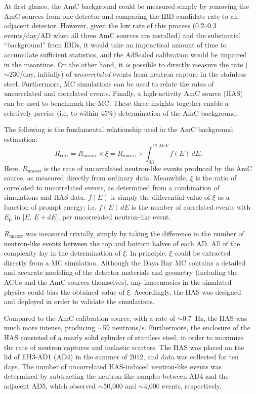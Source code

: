 \documentclass[../thesis.tex]{subfiles}
\begin{document}
At first glance, the AmC background could be measured simply by removing the AmC
sources from one detector and comparing the IBD candidate rate to an adjacent
detector. However, given the low rate of this process (0.2--0.3 events/day/AD
when all three AmC sources are installed) and the substantial ``background''
from IBDs, it would take an impractical amount of time to accumulate sufficient
statistics, and the AdScaled calibration would be impaired in the meantime. On
the other hand, it \emph{is} possible to directly measure the rate
($\sim$230/day, initially) of \emph{uncorrelated} events from neutron capture in
the stainless steel. Furthermore, MC simulations can be used to relate the rates
of uncorrelated and correlated events. Finally, a high-activity AmC source (HAS)
can be used to benchmark the MC. These three insights together enable a
relatively precise (i.e. to within 45\%) determination of the AmC background.

The following is the fundamental relationship used in the AmC background
estimation:
\begin{equation*}
  R_{\mathrm{corr}} = R_{\mathrm{uncorr}} \times \xi = R_{\mathrm{uncorr}} \times \int_{0.7}^{\SI{12}{MeV}} f(E)\,dE.
\end{equation*}
Here, $R_{\mathrm{uncorr}}$ is the rate of uncorrelated neutron-like events
produced by the AmC source, as measured directly from ordinary data. Meanwhile,
$\xi$ is the ratio of correlated to uncorrelated events, as determined from a
combination of simulations and HAS data. $f(E)$ is simply the differential value
of $\xi$ as a function of prompt energy; i.e. $f(E)\,dE$ is the number of
correlated events with $E_{\mathrm{p}}$ in [$E$, $E + dE$], per uncorrelated
neutron-like event.

$R_{\mathrm{uncorr}}$ was measured trivially, simply by taking the difference in
the number of neutron-like events between the top and bottom halves of each
AD. All of the complexity lay in the determination of $\xi$. In principle, $\xi$
could be extracted directly from a MC simulation. Although the Daya Bay MC
contains a detailed and accurate modeling of the detector materials and geometry
(including the ACUs and the AmC sources themselves), any inaccuracies in the
simulated physics could bias the obtained value of $\xi$. Accordingly, the HAS
was designed and deployed in order to validate the simulations.

Compared to the AmC calibration source, with a rate of $\sim$0.7~Hz, the HAS was
much more intense, producing $\sim$59 neutrons/s. Furthermore, the enclosure of
the HAS consisted of a nearly solid cylinder of stainless steel, in order to
maximize the rate of neutron captures and inelastic scatters. The HAS was placed
on the lid of EH3-AD1 (AD4) in the summer of 2012, and data was collected for
ten days. The number of uncorrelated HAS-induced neutron-like events was
determined by subtracting the neutron-like samples between AD4 and the adjacent
AD5, which observed $\sim$50,000 and $\sim$4,000 events, respectively.
\end{document}
